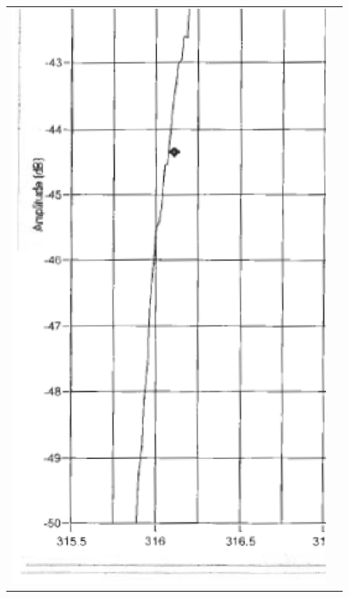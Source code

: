\begin{figure}[H]
\begin{tabular}{c c}
    \includegraphics[bb=249 194 1431 1035,scale=0.2]{graphics/log_book/ch15_lowf.eps} & 

\end{tabular}
\end{figure}

